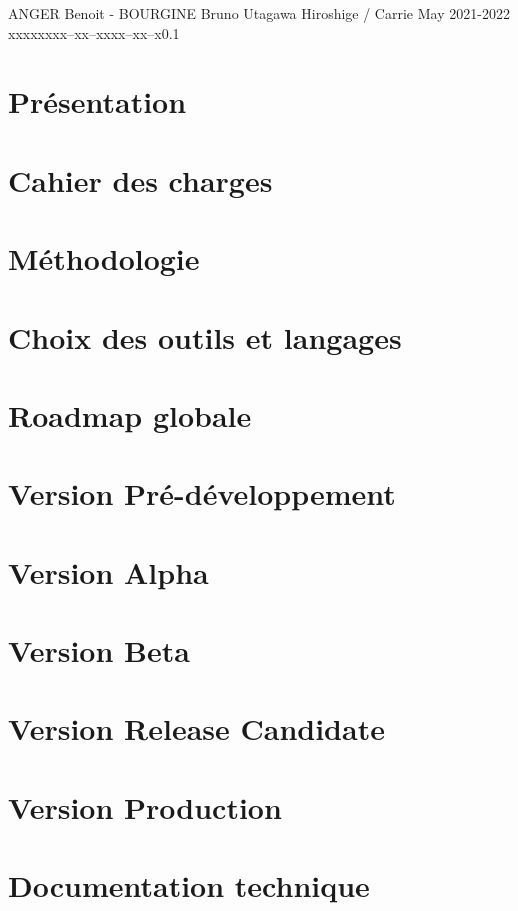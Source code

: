 \documentclass{tstextbook}
\begin{document}
       {ANGER Benoit - BOURGINE Bruno}
       {Utagawa Hiroshige / Carrie May}
       {2021-2022}
       {xxxxx}{xxx--xx--xxxx--xx--x}{0.1}
       {}
       {}



\chapter{Présentation}


\chapter{Cahier des charges}


\chapter{Méthodologie}


\chapter{Choix des outils et langages}



\chapter{Roadmap globale}


\chapter{Version Pré-développement}


\chapter{Version Alpha}


\chapter{Version Beta}


\chapter{Version Release Candidate}


\chapter{Version Production}




\chapter*{Documentation technique}

\end{document}
